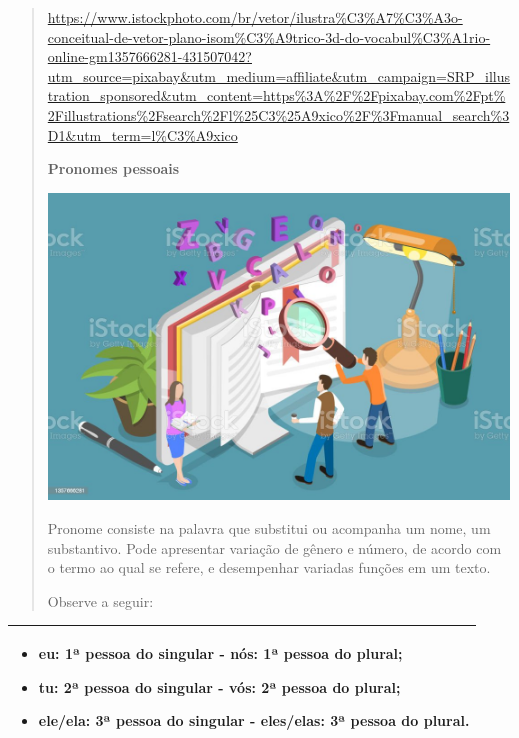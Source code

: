 \begin{quote}
\url{https://www.istockphoto.com/br/vetor/ilustra\%C3\%A7\%C3\%A3o-conceitual-de-vetor-plano-isom\%C3\%A9trico-3d-do-vocabul\%C3\%A1rio-online-gm1357666281-431507042?utm_source=pixabay\&utm_medium=affiliate\&utm_campaign=SRP_illustration_sponsored\&utm_content=https\%3A\%2F\%2Fpixabay.com\%2Fpt\%2Fillustrations\%2Fsearch\%2Fl\%25C3\%25A9xico\%2F\%3Fmanual_search\%3D1\&utm_term=l\%C3\%A9xico}

\textbf{Pronomes pessoais}

\includegraphics[width=4.81250in,height=3.20531in]{media/image33.jpeg}

Pronome consiste na palavra que substitui ou acompanha um nome, um
substantivo. Pode apresentar variação de gênero e número, de acordo com
o termo ao qual se refere, e desempenhar variadas funções em um texto.

Observe a seguir:
\end{quote}

\begin{longtable}[]{@{}l@{}}
\toprule
\begin{minipage}[t]{0.97\columnwidth}\raggedright\strut
\begin{itemize}
\item
  eu: 1ª pessoa do singular - nós: 1ª pessoa do plural;
\item
  tu: 2ª pessoa do singular - vós: 2ª pessoa do plural;
\item
  ele/ela: 3ª pessoa do singular - eles/elas: 3ª pessoa do plural.
\end{itemize}\strut
\end{minipage}\tabularnewline
\bottomrule
\end{longtable}

